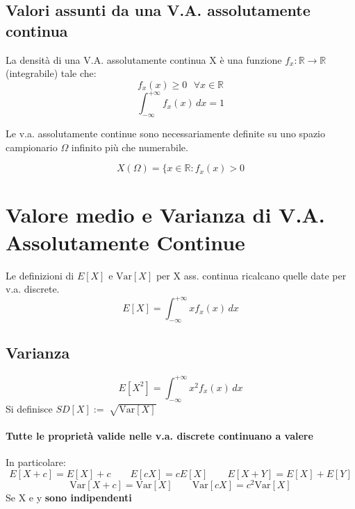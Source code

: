 \subsection{Valori assunti da una V.A. assolutamente continua}
La densità di una V.A. assolutamente continua X è una funzione $f_x:\mathbb{R} \rightarrow \mathbb{R}$ (integrabile)
tale che:
\begin{equation*}
    f_x(x) \geq 0 \textrm{ } \forall x \in  \mathbb{R}
\end{equation*}
\begin{equation*}
    \int_{-\infty}^{+\infty} f_x(x)  \,dx = 1
\end{equation*}

Le v.a. assolutamente continue sono necessariamente definite su uno spazio campionario
$\Omega$ infinito più che numerabile.

\begin{equation*}
    X(\Omega) = \{ x \in \mathbb{R} : f_x (x) > 0
\end{equation*}

\section{Valore medio e Varianza di V.A. Assolutamente Continue}
Le definizioni di $E[X]$ e $\text{Var}[X]$ per X ass. continua ricalcano quelle date per
v.a. discrete.
\begin{equation*}
    E[X] = \int_{-\infty}^{+\infty} x f_x(x) \,dx 
\end{equation*}
\subsection*{Varianza}
\begin{equation*}
    E[X^2] = \int_{-\infty}^{+\infty} x^2 f_x(x) \,dx
\end{equation*}
Si definisce $SD[X] := \sqrt[]{\text{Var}[X]}$
\paragraph*{Tutte le proprietà valide nelle v.a. discrete continuano a valere}
In particolare:
\begin{equation*}
    E[X+c] = E[X] + c \qquad E[cX] = cE[X] \qquad E[X+Y] = E[X] + E[Y]
\end{equation*}
\begin{equation*}
    \text{Var}[X+c] = \text{Var}[X] \qquad \text{Var}[cX] = c^2 \text{Var}[X]
\end{equation*}
Se X e y \textbf{sono indipendenti}
